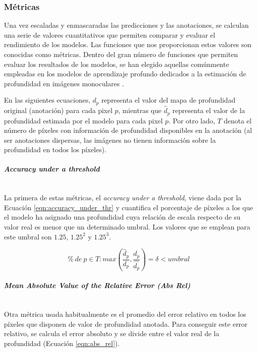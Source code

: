 \subsubsection{Métricas}
Una vez escaladas y enmascaradas las predicciones y las anotaciones, se calculan una serie de valores cuantitativos que permiten comparar y evaluar el rendimiento de los modelos. Las funciones que nos proporcionan estos valores son conocidas como métricas. Dentro del gran número de funciones que permiten evaluar los resultados de los modelos, se han elegido aquellas comúnmente empleadas en los modelos de aprendizaje profundo dedicados a la estimación de profundidad en imágenes monoculares \cite{visiontransformersDPT,bhat2020adabins,eigen-multi-scale,midas-intel,bts,DORN,evaluation-cnn-depth-estimation, depth-estimation-metrics}.

En las siguientes ecuaciones, $d_p$ representa el valor del mapa de profundidad original (anotación) para cada pixel $p$, mientras que $\hat{d}_p$ representa el valor de la profundidad estimada por el modelo para cada pixel $p$. Por otro lado, $T$ denota el número de píxeles con información de profundidad disponibles en la anotación (al ser anotaciones dispersas, las imágenes no tienen información sobre la profundidad en todos los píxeles).


\paragraph{\textit{Accuracy under a threshold}}\mbox{}\\
La primera de estas métricas, el \textit{accuracy under a threshold}, viene dada por la Ecuación \ref{eqn:accuracy_under_thr} y cuantifica el porcentaje de píxeles a los que el modelo ha asignado una profundidad cuya relación de escala respecto de su valor real es menor que un determinado umbral. Los valores que se emplean para este umbral son $1.25$, $1.25^2$ y $1.25^3$.

\begin{equation}
\label{eqn:accuracy_under_thr}
\% \ de \ p \in T : max(\frac{\hat{d}_p}{d_p},\frac{d_p}{\hat{d_p}}) = \delta < umbral 
\end{equation}

\paragraph{\textit{Mean Absolute Value of the Relative Error (Abs Rel)}}\mbox{}\\
Otra métrica usada habitualmente es el promedio del error relativo en todos los píxeles que disponen de valor de profundidad anotada. Para conseguir este error relativo, se calcula el error absoluto y se divide entre el valor real de la profundidad (Ecuación \ref{eqn:abs_rel}).

